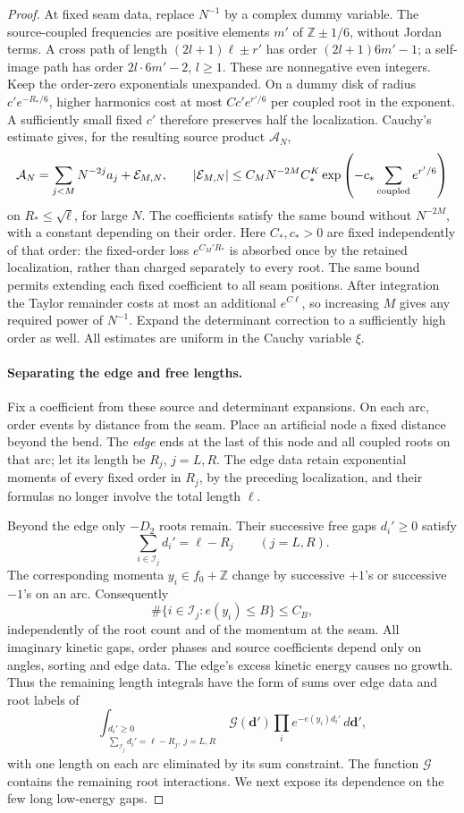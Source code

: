 \documentclass[11pt]{article}
\numberwithin{equation}{section}
\theoremstyle{definition}\newtheorem{definition}[theorem]{Definition}
\theoremstyle{remark}\newtheorem{remark}[theorem]{Remark}
\begin{document}
\begin{proof}
At fixed seam data, replace \(N^{-1}\) by a complex dummy variable.
The source-coupled frequencies are positive elements \(m'\) of
\(\mathbb Z\pm1/6\), without Jordan terms. A cross path of length
\((2l+1)\ell\pm r'\) has order \((2l+1)6m'-1\); a self-image path
has order \(2l\cdot6m'-2\), \(l\ge1\). These are nonnegative even
integers. Keep the order-zero exponentials unexpanded. On a dummy disk
of radius \(c'e^{-R_*/6}\), higher harmonics cost at most
\(Cc'e^{r'/6}\) per coupled root in the exponent. A sufficiently
small fixed \(c'\) therefore preserves half the localization.
Cauchy's estimate gives, for the resulting source product
\(\mathcal A_N\),
\[
 \mathcal A_N=\sum_{j<M}N^{-2j}a_j+\mathcal E_{M,N},
 \qquad
 |\mathcal E_{M,N}|
 \le C_M N^{-2M} C_*^K
        \exp\left(-c_*\sum_{\rm coupled} e^{r'/6}\right)
\]
on \(R_*\le\sqrt\ell\), for large \(N\). The coefficients satisfy
the same bound without \(N^{-2M}\), with a constant depending on their
order. Here \(C_*,c_*>0\) are fixed independently of that order:
the fixed-order loss \(e^{C_M'R_*}\) is absorbed once by the retained
localization, rather than charged separately to every root. The same
bound permits extending each fixed coefficient to all seam positions.
After integration the Taylor remainder costs at most an additional
\(e^{C\ell}\), so increasing \(M\) gives any required power of
\(N^{-1}\). Expand the determinant correction to a sufficiently high
order as well. All estimates are uniform in the Cauchy variable \(\xi\).

\paragraph{Separating the edge and free lengths.}
Fix a coefficient from these source and determinant expansions. On each
arc, order events by distance from the seam. Place an artificial node a
fixed distance beyond the bend. The \emph{edge} ends at the last of
this node and all coupled roots on that arc; let its length be
\(R_j\), \(j=L,R\). The edge data retain exponential moments of
every fixed order in \(R_j\), by the preceding localization, and their
formulas no longer involve the total length \(\ell\).

Beyond the edge only \(-D_2\) roots remain. Their successive free gaps
\(d_i'\ge0\) satisfy
\[
 \sum_{i\in\mathcal I_j}d_i'=\ell-R_j
       \qquad (j=L,R).
\]
The corresponding momenta \(y_i\in f_0+\mathbb Z\) change by
successive \(+1\)'s or successive \(-1\)'s on an arc. Consequently
\[
 \#\{i\in\mathcal I_j:e(y_i)\le B\}\le C_B,
\]
independently of the root count and of the momentum at the seam.
All imaginary kinetic gaps, order phases and source coefficients depend
only on angles, sorting and edge data. The edge's excess kinetic energy
causes no growth. Thus the remaining length integrals have the form of
sums over edge data and root labels of
\[
 \int_{\substack{d_i'\ge0\\
       \sum_{\mathcal I_j}d_i'=\ell-R_j,\ j=L,R}}
       \mathcal G(\boldsymbol d')
       \prod_i e^{-e(y_i)d_i'}\,d\boldsymbol d',
\]
with one length on each arc eliminated by its sum constraint.
The function \(\mathcal G\) contains the remaining root interactions.
We next expose its dependence on the few long low-energy gaps.


\end{proof}
\end{document}
